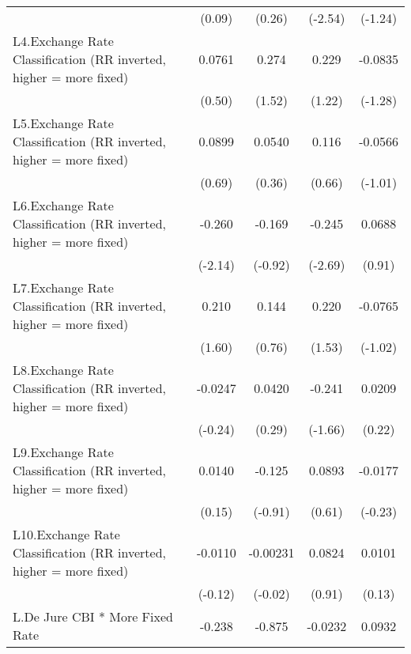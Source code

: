 {\begin{longtable}{l*{4}{c}}
                &   (0.09)         &   (0.26)         &  (-2.54)         &  (-1.24)         \\
\addlinespace
L4.Exchange Rate Classification (RR inverted, higher = more fixed)&   0.0761         &    0.274         &    0.229         &  -0.0835         \\
                &   (0.50)         &   (1.52)         &   (1.22)         &  (-1.28)         \\
\addlinespace
L5.Exchange Rate Classification (RR inverted, higher = more fixed)&   0.0899         &   0.0540         &    0.116         &  -0.0566         \\
                &   (0.69)         &   (0.36)         &   (0.66)         &  (-1.01)         \\
\addlinespace
L6.Exchange Rate Classification (RR inverted, higher = more fixed)&   -0.260\sym{*}  &   -0.169         &   -0.245\sym{**} &   0.0688         \\
                &  (-2.14)         &  (-0.92)         &  (-2.69)         &   (0.91)         \\
\addlinespace
L7.Exchange Rate Classification (RR inverted, higher = more fixed)&    0.210         &    0.144         &    0.220         &  -0.0765         \\
                &   (1.60)         &   (0.76)         &   (1.53)         &  (-1.02)         \\
\addlinespace
L8.Exchange Rate Classification (RR inverted, higher = more fixed)&  -0.0247         &   0.0420         &   -0.241         &   0.0209         \\
                &  (-0.24)         &   (0.29)         &  (-1.66)         &   (0.22)         \\
\addlinespace
L9.Exchange Rate Classification (RR inverted, higher = more fixed)&   0.0140         &   -0.125         &   0.0893         &  -0.0177         \\
                &   (0.15)         &  (-0.91)         &   (0.61)         &  (-0.23)         \\
\addlinespace
L10.Exchange Rate Classification (RR inverted, higher = more fixed)&  -0.0110         & -0.00231         &   0.0824         &   0.0101         \\
                &  (-0.12)         &  (-0.02)         &   (0.91)         &   (0.13)         \\
\addlinespace
L.De Jure CBI * More Fixed Rate&   -0.238         &   -0.875\sym{*}  &  -0.0232         &   0.0932         \\

\end{longtable}}

